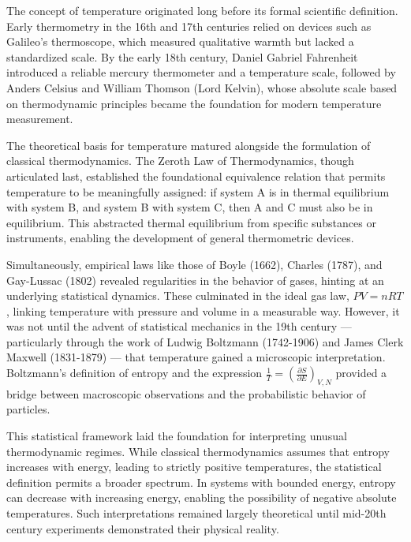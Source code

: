 \begin{historical}
The concept of temperature originated long before its formal scientific definition. Early thermometry in the 16th and 17th centuries relied on devices such as Galileo’s thermoscope, which measured qualitative warmth but lacked a standardized scale. By the early 18th century, Daniel Gabriel Fahrenheit introduced a reliable mercury thermometer and a temperature scale, followed by Anders Celsius and William Thomson (Lord Kelvin), whose absolute scale based on thermodynamic principles became the foundation for modern temperature measurement.

The theoretical basis for temperature matured alongside the formulation of classical thermodynamics. The Zeroth Law of Thermodynamics, though articulated last, established the foundational equivalence relation that permits temperature to be meaningfully assigned: if system A is in thermal equilibrium with system B, and system B with system C, then A and C must also be in equilibrium. This abstracted thermal equilibrium from specific substances or instruments, enabling the development of general thermometric devices.

Simultaneously, empirical laws like those of Boyle (1662), Charles (1787), and Gay-Lussac (1802) revealed regularities in the behavior of gases, hinting at an underlying statistical dynamics. These culminated in the ideal gas law, \( PV = nRT \), linking temperature with pressure and volume in a measurable way. However, it was not until the advent of statistical mechanics in the 19th century — particularly through the work of Ludwig Boltzmann (1742-1906) and James Clerk Maxwell (1831-1879) — that temperature gained a microscopic interpretation. Boltzmann’s definition of entropy and the expression \( \frac{1}{T} = \left(\frac{\partial S}{\partial E}\right)_{V,N} \) provided a bridge between macroscopic observations and the probabilistic behavior of particles.

This statistical framework laid the foundation for interpreting unusual thermodynamic regimes. While classical thermodynamics assumes that entropy increases with energy, leading to strictly positive temperatures, the statistical definition permits a broader spectrum. In systems with bounded energy, entropy can decrease with increasing energy, enabling the possibility of negative absolute temperatures. Such interpretations remained largely theoretical until mid-20th century experiments demonstrated their physical reality. 
\end{historical}
